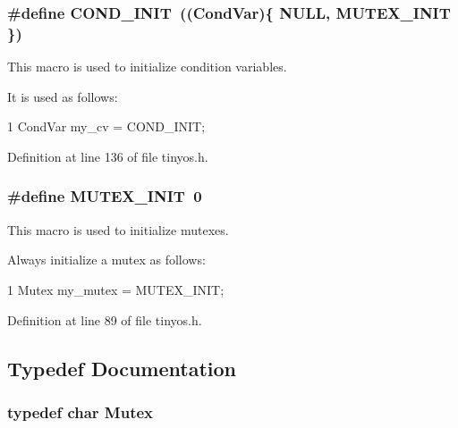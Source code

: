 \subsubsection[{\texorpdfstring{C\+O\+N\+D\+\_\+\+I\+N\+IT}{COND_INIT}}]{\setlength{\rightskip}{0pt plus 5cm}\#define C\+O\+N\+D\+\_\+\+I\+N\+IT~(({\bf Cond\+Var})\{ N\+U\+LL, {\bf M\+U\+T\+E\+X\+\_\+\+I\+N\+IT} \})}\hypertarget{group__syscalls_ga6a7055a466bff255172e05f6ec82d792}{}\label{group__syscalls_ga6a7055a466bff255172e05f6ec82d792}


This macro is used to initialize condition variables. 

It is used as follows\+: 
\begin{DoxyCode}
1 CondVar my\_cv = COND\_INIT;
\end{DoxyCode}
 

Definition at line 136 of file tinyos.\+h.

\subsubsection[{\texorpdfstring{M\+U\+T\+E\+X\+\_\+\+I\+N\+IT}{MUTEX_INIT}}]{\setlength{\rightskip}{0pt plus 5cm}\#define M\+U\+T\+E\+X\+\_\+\+I\+N\+IT~0}\hypertarget{group__syscalls_ga96be0bfc33e7e113099c7546798bec99}{}\label{group__syscalls_ga96be0bfc33e7e113099c7546798bec99}


This macro is used to initialize mutexes. 

Always initialize a mutex as follows\+: 
\begin{DoxyCode}
1 Mutex my\_mutex = MUTEX\_INIT;
\end{DoxyCode}
 

Definition at line 89 of file tinyos.\+h.



\subsection{Typedef Documentation}
\subsubsection[{\texorpdfstring{Mutex}{Mutex}}]{\setlength{\rightskip}{0pt plus 5cm}typedef char {\bf Mutex}}\hypertarget{group__syscalls_gaef2ec62cae8e0031fd19fc8b91083ade}{}\label{group__syscalls_gaef2ec62cae8e0031fd19fc8b91083ade}



